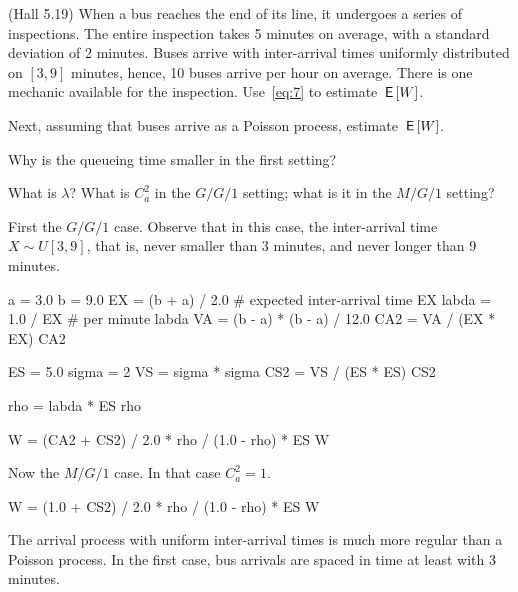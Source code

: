 \begin{exercise}\label{ex:91}
  (Hall 5.19) When a bus reaches the end of its line, it undergoes a series of inspections.
  The entire inspection takes 5 minutes on average, with a standard deviation of 2 minutes.
  Buses arrive with inter-arrival times uniformly distributed on $[3,9]$ minutes, hence, 10 buses arrive per hour  on average.  There is one mechanic available for the inspection.
  Use~\cref{eq:7} to  estimate $\,\mathsf{E}\left[W\right]$.

Next, assuming that buses arrive as a Poisson process, estimate $\,\mathsf{E}\left[W\right]$.

 Why is the queueing time smaller in the first setting?
\begin{hint}
  What is $\lambda$? What is $C_a^2$ in the $G/G/1$ setting; what is it in the $M/G/1$ setting?
\end{hint}

\begin{solution}
First the $G/G/1$ case. Observe that in this case, the inter-arrival time $X\sim U[3,9]$, that is, never smaller than 3 minutes, and never longer than 9 minutes.

\begin{pyconsole}
a = 3.0
b = 9.0
EX = (b + a) / 2.0  # expected inter-arrival time
EX
labda = 1.0 / EX  # per minute
labda
VA = (b - a) * (b - a) / 12.0
CA2 = VA / (EX * EX)
CA2

ES = 5.0
sigma = 2
VS = sigma * sigma
CS2 = VS / (ES * ES)
CS2

rho = labda * ES
rho

W = (CA2 + CS2) / 2.0 * rho / (1.0 - rho) * ES
W
\end{pyconsole}

Now the $M/G/1$ case. In that case $C_a^2=1$.
\begin{pyconsole}
W = (1.0 + CS2) / 2.0 * rho / (1.0 - rho) * ES
W
\end{pyconsole}

The arrival process with uniform inter-arrival times is much more regular than a Poisson process.
In the first case, bus arrivals are spaced in time at least with 3 minutes.
\end{solution}
\end{exercise}


